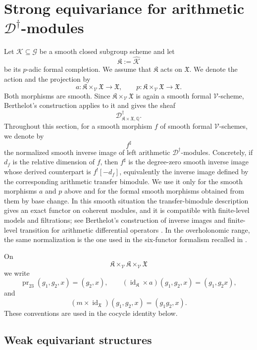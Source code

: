 \documentclass[11pt]{amsart}
\theoremstyle{plain}
\theoremstyle{definition}
\theoremstyle{remark}
\begin{document}
\section{Strong equivariance for arithmetic
\texorpdfstring{\(\mathscr D^\dagger\)}{Ddagger}-modules}
\label{sec:strong-equivariance}

Let \(\mathcal K\subseteq \mathcal G\) be a smooth closed subgroup scheme and let
\[
  \mathfrak K:=\widehat{\mathcal K}
\]
be its \(p\)-adic formal completion. We assume that \(\mathfrak K\) acts on
\(\mathfrak X\). We denote the action and the projection by
\[
  a:\mathfrak K\times_{\mathcal V}\mathfrak X\longrightarrow \mathfrak X,
  \qquad
  p:\mathfrak K\times_{\mathcal V}\mathfrak X\longrightarrow \mathfrak X.
\]
Both morphisms are smooth. Since \(\mathfrak K\times_{\mathcal V}\mathfrak X\)
is again a smooth formal \(\mathcal V\)-scheme, Berthelot's construction applies
to it and gives the sheaf
\[
  \mathscr D^\dagger_{\mathfrak K\times\mathfrak X,\mathbb Q}.
\]
Throughout this section, for a smooth morphism \(f\)
of smooth formal \(\mathcal V\)-schemes, we denote by
\[
  f^\sharp
\]
the normalized smooth inverse image of left arithmetic \(\mathscr D^\dagger\)-modules.
Concretely, if \(d_f\) is the relative dimension of \(f\), then \(f^\sharp\)
is the degree-zero smooth inverse image whose derived counterpart is
\(f^![-d_f]\), equivalently the inverse image defined by the corresponding
arithmetic transfer bimodule.  We use it only for the smooth morphisms \(a\)
and \(p\) above and for the formal smooth morphisms obtained from them by base
change.  In this smooth situation the transfer-bimodule description gives an
exact functor on coherent modules, and it is compatible with finite-level
models and filtrations; see Berthelot's construction of inverse images and
finite-level transition for arithmetic differential operators
\cite[5.3.2--5.3.4]{BerthelotIntro}.  In the overholonomic range, the same
normalization is the one used in the six-functor formalism recalled in
\cite[\S2.1, Lemmas 2.1.1--2.1.2]{HuygheSchmidtIntermediate}.

On
\[
  \mathfrak K\times_{\mathcal V}\mathfrak K\times_{\mathcal V}\mathfrak X
\]
we write
\[
  \operatorname{pr}_{23}(g_1,g_2,x)=(g_2,x),
  \qquad
  (\operatorname{id}_{\mathfrak K}\times a)(g_1,g_2,x)=(g_1,g_2x),
\]
and
\[
  (m\times\operatorname{id}_{\mathfrak X})(g_1,g_2,x)=(g_1g_2,x).
\]
These conventions are used in the cocycle identity below.

\subsection{Weak equivariant structures}
\end{document}
